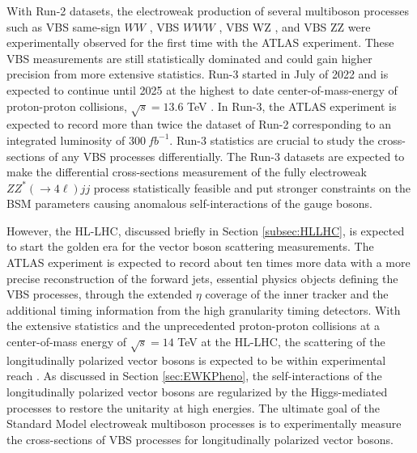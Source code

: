 With Run-2 datasets, the electroweak production of several multiboson processes such as VBS same-sign $WW$ \cite{EWk_ssWW}, VBS $WWW$ \cite{EWK_WWW}, VBS WZ \cite{EWK_WZ}, and VBS ZZ \cite{ATLASZZjj} were experimentally observed for the first time with the ATLAS experiment. These VBS measurements are still statistically dominated and could gain higher precision from more extensive statistics. Run-3 started in July of 2022 and is expected to continue until 2025 at the highest to date center-of-mass-energy of proton-proton collisions, $\sqrt{s}=13.6$ TeV \cite{Run3}. In Run-3, the ATLAS experiment is expected to record more than twice the dataset of Run-2 corresponding to an integrated luminosity of $300 ~fb^{-1}$. Run-3 statistics are crucial to study the cross-sections of any VBS processes differentially. The Run-3 datasets are expected to make the differential cross-sections measurement of the fully electroweak $ZZ^*(\rightarrow 4\ell) jj$ process statistically feasible and put stronger constraints on the BSM parameters causing anomalous self-interactions of the gauge bosons. 

However, the HL-LHC, discussed briefly in Section \ref{subsec:HLLHC}, is expected to start the golden era for the vector boson scattering measurements. The ATLAS experiment is expected to record about ten times more data with a more precise reconstruction of the forward jets, essential physics objects defining the VBS processes, through the extended $\eta$ coverage of the inner tracker and the additional timing information from the high granularity timing detectors. With the extensive statistics and the unprecedented proton-proton collisions at a center-of-mass energy of $\sqrt{s}=14$ TeV at the HL-LHC, the scattering of the longitudinally polarized vector bosons is expected to be within experimental reach \cite{ssWW_HLLHCProspects}. As discussed in Section \ref{sec:EWKPheno}, the self-interactions of the longitudinally polarized vector bosons are regularized by the Higgs-mediated processes to restore the unitarity at high energies. The ultimate goal of the Standard Model electroweak multiboson processes is to experimentally measure the cross-sections of VBS processes for longitudinally polarized vector bosons.